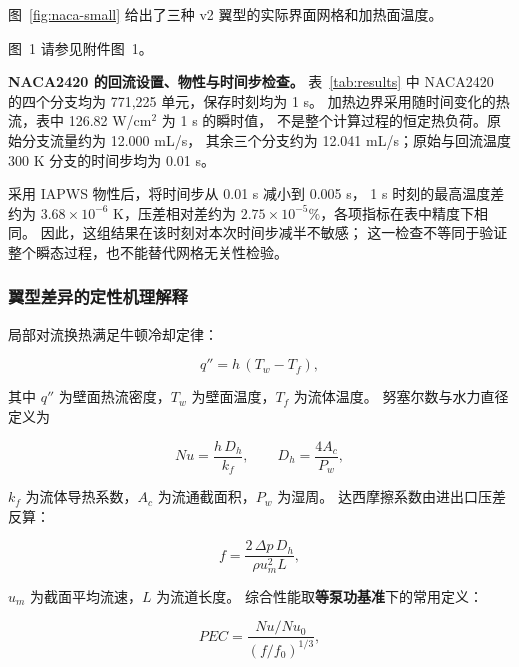 \documentclass[stage2,fontset=fandol]{ydzjreport}
\makeatletter
\newcommand{\submissionnumber}[1]{\def\@currentlabel{#1}}
\makeatother
\begin{document}
图~\ref{fig:naca-small} 给出了三种 v2 翼型的实际界面网格和加热面温度。



\par\noindent \begingroup\submissionnumber{1}\label{fig:naca-small}\endgroup 图~1 请参见附件图~1。\par


\textbf{NACA2420 的回流设置、物性与时间步检查。}
表~\ref{tab:results} 中 NACA2420 的四个分支均为 771,225 单元，保存时刻均为 1 s。
加热边界采用随时间变化的热流，表中 126.82 W/cm$^2$ 为 1 s 的瞬时值，
不是整个计算过程的恒定热负荷。原始分支流量约为 12.000 mL/s，
其余三个分支约为 12.041 mL/s；原始与回流温度 300 K 分支的时间步均为 0.01 s。


采用 IAPWS 物性后，将时间步从 0.01 s 减小到 0.005 s，
1 s 时刻的最高温度差约为 $3.68\times10^{-6}$ K，压差相对差约为
$2.75\times10^{-5}\%$，各项指标在表中精度下相同。
因此，这组结果在该时刻对本次时间步减半不敏感；
这一检查不等同于验证整个瞬态过程，也不能替代网格无关性检验。


\subsubsection{翼型差异的定性机理解释}

局部对流换热满足牛顿冷却定律：

\begin{equation}
q'' = h\,(T_w - T_f),
\label{eq:newton}
\end{equation}

其中 $q''$ 为壁面热流密度，$T_w$ 为壁面温度，$T_f$ 为流体温度。
努塞尔数与水力直径定义为

\begin{equation}
Nu = \frac{h\,D_h}{k_f},\qquad D_h = \frac{4A_c}{P_w},
\label{eq:nu}
\end{equation}

$k_f$ 为流体导热系数，$A_c$ 为流通截面积，$P_w$ 为湿周。
达西摩擦系数由进出口压差反算：

\begin{equation}
f = \frac{2\,\Delta p\,D_h}{\rho u_m^2 L},
\label{eq:friction}
\end{equation}

$u_m$ 为截面平均流速，$L$ 为流道长度。
综合性能取\textbf{等泵功基准}下的常用定义：

\begin{equation}
PEC = \frac{Nu/Nu_0}{\left(f/f_0\right)^{1/3}},
\label{eq:pec}
\end{equation}
\end{document}

